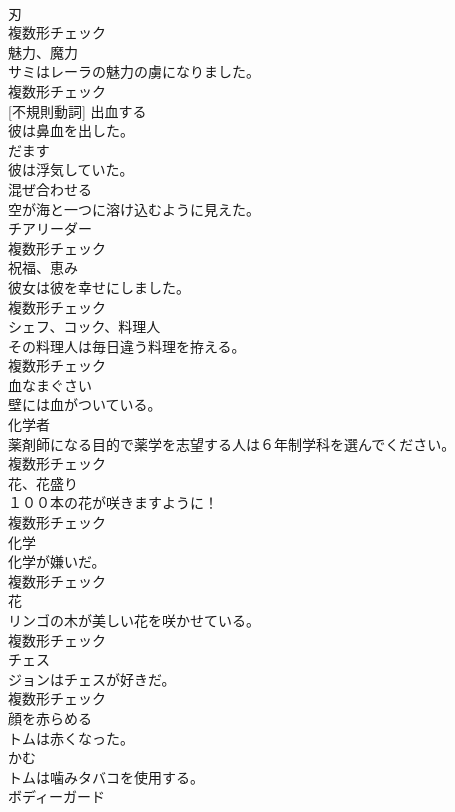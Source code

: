 \documentclass[8pt]{extreport}
\begin{document}
\begin{CJK}{UTF8}{min}
\\	[名詞]	刃	
\\	複数形チェック
\\	[名詞]	魅力、魔力	
\\	サミはレーラの魅力の虜になりました。	
\\	複数形チェック
\\	[動詞] [不規則動詞]	出血する	
\\	彼は鼻血を出した。	
\\	[動詞]	だます	
\\	彼は浮気していた。	
\\	[動詞]	混ぜ合わせる	
\\	空が海と一つに溶け込むように見えた。	
\\	[名詞]	チアリーダー	
\\	複数形チェック
\\	[名詞]	祝福、恵み	
\\	彼女は彼を幸せにしました。	
\\	複数形チェック
\\	[名詞]	シェフ、コック、料理人	
\\	その料理人は毎日違う料理を拵える。	
\\	複数形チェック
\\	[形容詞]	血なまぐさい	
\\	壁には血がついている。	
\\	[名詞]	化学者	
\\	薬剤師になる目的で薬学を志望する人は６年制学科を選んでください。	
\\	複数形チェック
\\	[名詞]	花、花盛り	
\\	１００本の花が咲きますように！	
\\	複数形チェック
\\	[名詞]	化学	
\\	化学が嫌いだ。	
\\	複数形チェック
\\	[名詞]	花	
\\	リンゴの木が美しい花を咲かせている。	
\\	複数形チェック
\\	[名詞]	チェス	
\\	ジョンはチェスが好きだ。	
\\	複数形チェック
\\	[動詞]	顔を赤らめる	
\\	トムは赤くなった。	
\\	[動詞]	かむ	
\\	トムは噛みタバコを使用する。	
\\	[名詞]	ボディーガード	

\end{CJK}
\end{document}
